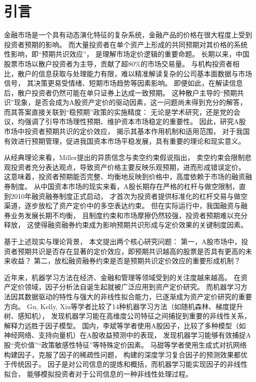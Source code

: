 
\chapter{引言}

金融市场是一个具有动态演化特征的复杂系统，金融产品的价格在很大程度上受到投资者预期的影响。
而大量投资者在单个资产上形成的共同预期对其价格的系统性影响，即“预期共识效应”，
是理解市场定价逻辑的重要命题\cite{greenwood2014expectations}。
长期以来，中国股票市场以散户投资者为主导，贡献了超80\%的市场交易量\cite{jones2025retail}。
与机构投资者相比，散户的信息获取与处理能力有限，难以精准解读复杂的公司基本面数据与市场信号，
其决策更易受情绪、短期市场趋势等因素影响\cite{xue2020information}。
即便如此，在解读信息后，散户投资者仍然可能在单只证券上达成一致预期\cite{easley1983consensus}。
这种散户主导的“预期共识”现象，是否会成为A股资产定价的驱动因素，这一问题尚未得到充分的解答，
而其答案直接关联到“稳预期”政策的实施精度：
无论是学术研究\cite{wu2015why}，还是党的会议，均强调了引导市场理性预期、维护资本市场稳定的重要性。
因此，研究A股市场中投资者预期共识的定价效应，
揭示其基本作用机制和适用范围，
对于我国有效进行预期管理，促进我国资本市场平稳发展，具有重要的理论和现实意义。

从经典理论来看，Miller提出的异质信念与卖空约束假说指出，
卖空约束会限制悲观投资者充分表达观点，导致资产价格主要反映乐观预期，进而形成错误定价\cite{miller1977risk}。
这意味着，投资者预期能否完整、均衡地反映到价格中，高度依赖于市场的融资融券制度。
从中国资本市场的现实来看，A股长期存在严格的杠杆与做空限制，直到2010年融资融券制度正式启动，
才首次为投资者提供标准化的杠杆交易与做空渠道，逐步放松了资产定价中的多空表达约束\cite{王永钦2026杠杆信息与流动性}。
但在实际运行中，我国融资与融券业务发展长期不均衡\cite{褚2019margin}，
且制度约束和市场摩擦仍然较强\cite{顾琪2017卖空摩擦与股价同步性}，投资者预期难以充分释放，
这使得融资融券约束成为影响预期共识形成与定价效果的关键制度因素。

基于上述现实与理论背景，
本文提出两个核心研究问题：
第一，A股市场中，投资者预期共识是否存在显著的定价效应，即预期共识越高的股票是否具有更高的未来收益？
第二，放松融资融券约束是否是预期共识定价效应的重要形成机制？

近年来，机器学习方法在经济、金融和管理等领域受到的关注度越来越高\cite{hong2021how}。
在资产定价领域，因子分析法\cite{sharpe1964capital}\cite{fama1992cross}自诞生起就被广泛应用到资产定价研究。
而机器学习方法因其数据驱动的特性与强大的非线性拟合能力，已逐渐成为资产定价研究的重要方向。
Gu, Kelly, Xiu等学者\cite{gu2020machine}比较了14种机器学习方法（如随机森林、梯度提升树、感知机），
发现机器学习能在高维度公司特征之间捕捉到重要的非线性关系，解释力远胜于因子模型。
国内，李斌等学者\cite{li2019machine}使用A股因子，比较了多种模型（如神经网络、支持向量机）在A股收益预测中的表现，
发现机器学习能够有效捕捉A股“壳价值”“政策敏感性特征”等特殊定价因素。
马甜等学者\cite{ma2022deep}使用生成式对抗网络构建因子，克服了因子的稀疏性问题，
构建的深度学习复合因子的预测效果都优于传统因子。
因子是对公司信息的提炼和概括，而机器学习能实现因子的非线性拟合，
能够模拟投资者对于公司信息的一种非线性处理过程。

